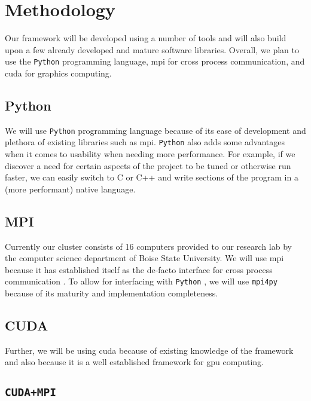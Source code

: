 \section{Methodology}

Our framework will be developed using a number of tools and will also build
upon a few already developed and mature software libraries. Overall, we plan to
use the \texttt{Python} programming language, \gls{mpi} for cross process
communication, and \gls{cuda} for graphics computing.

\subsection{Python}

We will use \texttt{Python} programming language because of its ease of
development and plethora of existing libraries such as \gls{mpi}.
\texttt{Python} also adds some advantages when it comes to usability when
needing more performance.  For example, if we discover a need for certain
aspects of the project to be tuned or otherwise run faster, we can easily
switch to C or C++ and write sections of the program in a (more performant)
native language.

\subsection{MPI}

Currently our cluster consists of 16 computers provided to our research lab by
the computer science department of Boise State University. We will use
\gls{mpi} because it has established itself as the de-facto interface for cross
process communication \cite{website:MPI-Tutorial}. To allow for interfacing
with \texttt{Python} \cite{website:mpi-4-python}, we will use \texttt{mpi4py}
because of its maturity and implementation completeness.

\subsection{CUDA}

Further, we will be using \gls{cuda} because of existing knowledge of the
framework and also because it is a well established framework for \gls{gpu}
computing.


\subsection{\texttt{CUDA+MPI}}

